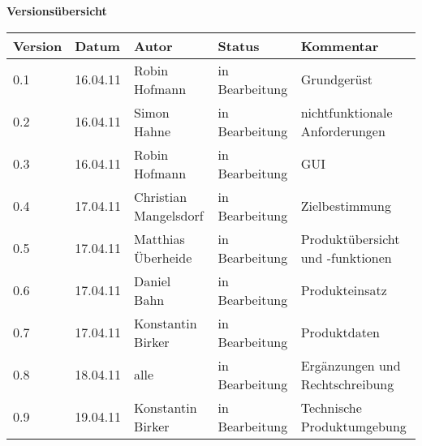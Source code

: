 

{\textbf{Versionsübersicht}}\\[2ex]

\begin{longtable}{|m{1.78cm}|m{1.59cm}|m{2.86cm}|m{1.9cm}|m{5.25cm}|}

  \hline                                              %

  \textbf{Version}  &    \textbf{Datum}  &    \textbf{Autor}  &
  \textbf{Status}   &    \textbf{Kommentar}  \\  %
  \hline                                              %

0.1&16.04.11&Robin Hofmann&in Bearbeitung&Grundgerüst\\
\hline 
0.2&16.04.11&Simon Hahne&in Bearbeitung&nichtfunktionale Anforderungen\\
\hline 
0.3&16.04.11&Robin Hofmann&in Bearbeitung&GUI\\
\hline 
0.4&17.04.11&Christian Mangelsdorf&in Bearbeitung&Zielbestimmung\\
\hline 
0.5&17.04.11&Matthias Überheide&in Bearbeitung&Produktübersicht und -funktionen\\
\hline 
0.6&17.04.11&Daniel Bahn&in Bearbeitung&Produkteinsatz\\
\hline 
0.7&17.04.11&Konstantin Birker&in Bearbeitung&Produktdaten\\
\hline 
0.8&18.04.11&alle&in Bearbeitung&Ergänzungen und Rechtschreibung\\
\hline 
0.9&19.04.11&Konstantin Birker&in Bearbeitung&Technische Produktumgebung\\
\hline 


\end{longtable}





